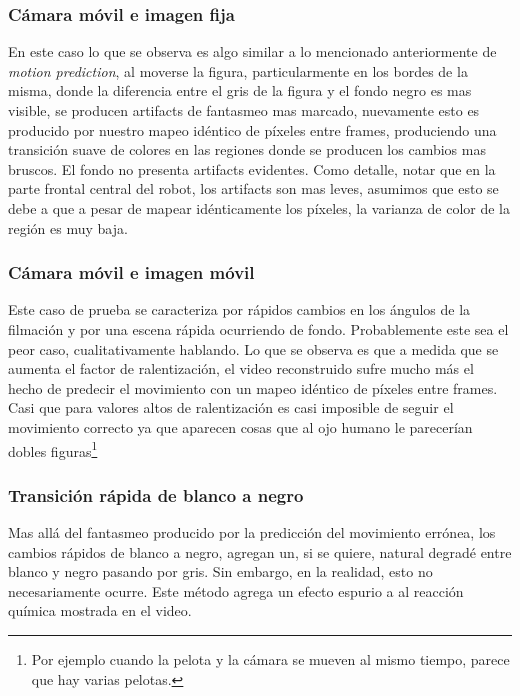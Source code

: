\subsubsection{Cámara móvil e imagen fija}
En este caso lo que se observa es algo similar a lo mencionado anteriormente de \emph{motion prediction}, al moverse la figura, particularmente en los bordes de la misma, donde la diferencia entre el gris de la figura y el fondo negro es mas visible, se producen artifacts de fantasmeo mas marcado, nuevamente esto es producido por nuestro mapeo idéntico de píxeles entre frames, produciendo una transición suave de colores en las regiones donde se producen los cambios mas bruscos. El fondo no presenta artifacts evidentes. Como detalle, notar que en la parte frontal central del robot, los artifacts son mas leves, asumimos que esto se debe a que a pesar de mapear idénticamente los píxeles, la varianza de color de la región es muy baja.

\subsubsection{Cámara móvil e imagen móvil}
Este caso de prueba se caracteriza por rápidos cambios en los ángulos de la filmación y por una escena rápida ocurriendo de fondo. Probablemente este sea el peor caso, cualitativamente hablando. Lo que se observa es que a medida que se aumenta el factor de ralentización, el video reconstruido sufre mucho más el hecho de predecir el movimiento con un mapeo idéntico de píxeles entre frames. Casi que para valores altos de ralentización es casi imposible de seguir el movimiento correcto ya que aparecen cosas que al ojo humano le parecerían dobles figuras\footnote{Por ejemplo cuando la pelota y la cámara se mueven al mismo tiempo, parece que hay varias pelotas.}

\subsubsection{Transición rápida de blanco a negro}
Mas allá del fantasmeo producido por la predicción del movimiento errónea, los cambios rápidos de blanco a negro, agregan un, si se quiere, natural degradé entre blanco y negro pasando por gris. Sin embargo, en la realidad, esto no necesariamente ocurre. Este método agrega un efecto espurio a al reacción química mostrada en el video.

